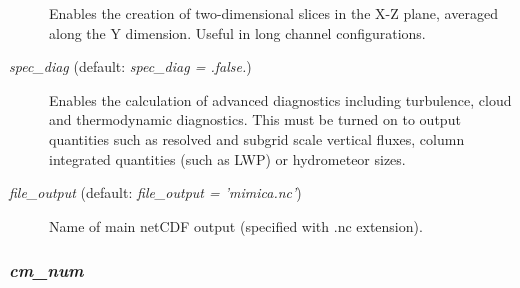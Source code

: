 \documentclass[12pt,A4,french]{article}
\begin{document}
\begin{description}
Enables the creation of two-dimensional slices in the X-Z plane, averaged along the Y dimension. Useful in long channel configurations.

\item[{\it spec\_diag} (default: {\it spec\_diag = .false.})]

Enables the calculation of advanced diagnostics including turbulence, cloud and thermodynamic diagnostics. This must be turned on to output quantities such as resolved and subgrid scale vertical fluxes, column integrated quantities (such as LWP) or hydrometeor sizes.

\item[{\it file\_output} (default: {\it file\_output = 'mimica.nc'})]

Name of main netCDF output (specified with .nc extension).

\end{description}

\subsubsection{{\it cm\_num}}
\end{document}
